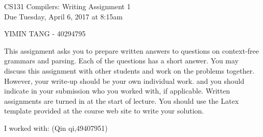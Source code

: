\documentclass[10pt]{article}
\begin{document}
\begin{center}
\Large CS131 Compilers: Writing Assignment 1\\Due Tuesday, April 6, 2017 at 8:15am
\end{center}

\begin{center}
\LARGE YIMIN TANG - 40294795
\end{center}

This assignment asks you to prepare written answers to questions on
context-free grammars and parsing. Each of the questions has a short answer. You
may discuss this assignment with other students and work on the problems
together. However, your write-up should be your own individual work.
and you should indicate in your submission who you worked with, if applicable.
Written assignments are turned in at the start of lecture.
You should use the Latex template provided at the course web site to write your solution.

\begin{center}
I worked with: (Qin qi,49407951)
\end{center}
\end{document}
